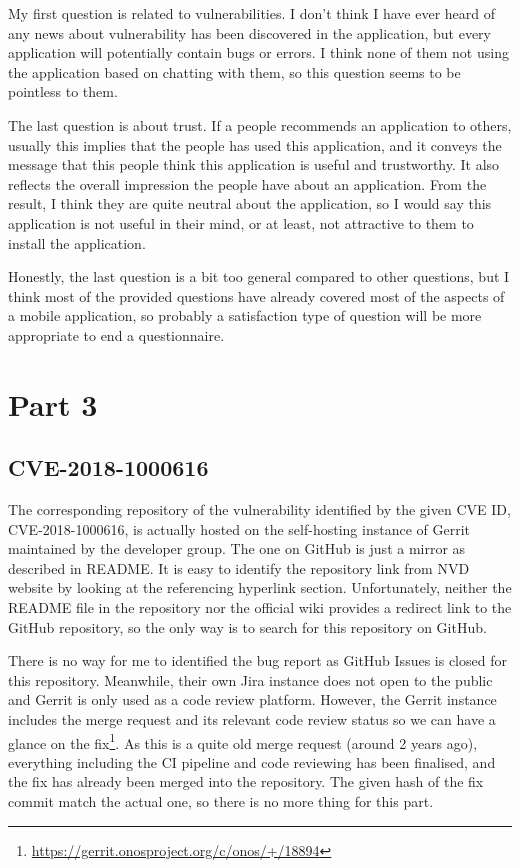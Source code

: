 \documentclass[12pt]{article}
\begin{document}
My first question is related to vulnerabilities. I don't think I have ever heard of any news about vulnerability has been discovered in the application, but every application will potentially contain bugs or errors. I think none of them not using the application based on chatting with them, so this question seems to be pointless to them.

The last question is about trust. If a people recommends an application to others, usually this implies that the people has used this application, and it conveys the message that this people think this application is useful and trustworthy. It also reflects the overall impression the people have about an application. From the result, I think they are quite neutral about the application, so I would say this application is not useful in their mind, or at least, not attractive to them to install the application.

Honestly, the last question is a bit too general compared to other questions, but I think most of the provided questions have already covered most of the aspects of a mobile application, so probably a satisfaction type of question will be more appropriate to end a questionnaire.

\section{Part 3}

\subsection{CVE-2018-1000616}

The corresponding repository of the vulnerability identified by the given CVE ID, CVE-2018-1000616, is actually hosted on the self-hosting instance of Gerrit maintained by the developer group. The one on GitHub is just a mirror as described in README. It is easy to identify the repository link from NVD website by looking at the referencing hyperlink section. Unfortunately, neither the README file in the repository nor the official wiki provides a redirect link to the GitHub repository, so the only way is to search for this repository on GitHub.

There is no way for me to identified the bug report as GitHub Issues is closed for this repository. Meanwhile, their own Jira instance does not open to the public and Gerrit is only used as a code review platform. However, the Gerrit instance includes the merge request and its relevant code review status so we can have a glance on the fix\footnote{\url{https://gerrit.onosproject.org/c/onos/+/18894}}. As this is a quite old merge request (around 2 years ago), everything including the CI pipeline and code reviewing has been finalised, and the fix has already been merged into the repository. The given hash of the fix commit match the actual one, so there is no more thing for this part.
\end{document}
